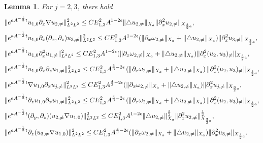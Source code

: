 \documentclass[12pt, reqno]{amsart}
\newtheorem{lemma}{Lemma}[section]
\numberwithin{equation}{section}
\begin{document}
	\begin{lemma}\label{lemma_neq2}
		For $j=2,3$, there hold
		\begin{equation}\label{lemma_neq2_2}
			\begin{aligned}&\|{\rm e}^{aA^{-\frac{1}{3}}t}
				u_{1,0}\partial_x\nabla u_{2,\neq}\|_{L^2L^2}^2\leq
				CE_{1,3}^2A^{1-2\epsilon}\|\triangle u_{2,\neq}\|_{X_a}\|\partial_x^2u_{2,\neq}\|_{X_{\frac32a}},\\
				&\|{\rm e}^{aA^{-\frac{1}{3}}t}
				u_{1,0}\partial_x(\partial_x,\partial_z) u_{3,\neq}\|_{L^2L^2}^2\leq
				CE_{1,3}^2A^{1-2\epsilon}(\|\partial_x\omega_{2,\neq}\|_{X_a}+\|\triangle u_{2,\neq}\|_{X_a})
				\|\partial_x^2u_{3,\neq}\|_{X_{\frac32a}},\\
				&\|{\rm e}^{aA^{-\frac{1}{3}}t}
				u_{1,0}\partial_x^{2} u_{1,\neq}\|_{L^2L^2}^2\leq
				CE_{1,3}^2A^{1-2\epsilon}(\|\partial_x\omega_{2,\neq}\|_{X_a}
				+\|\triangle u_{2,\neq}\|_{X_a})
				\|\partial_x^2(u_2,u_3)_{\neq}\|_{X_{\frac32a}},\\
				&\|e^{aA^{-\frac13}t}u_{1,0}\partial_{x}\partial_{z}u_{1,\neq}\|_{L^{2}L^{2}}^{2}\leq CE_{1,3}^{2}A^{\frac53-2\epsilon}\left(\|\partial_{x}\omega_{2,\neq}\|_{X_{a}}+\|\triangle u_{2,\neq}\|_{X_{a}} \right)\|\partial_{x}^{2}(u_{2},u_{3})_{\neq}\|_{X_{\frac32 a}},
				\\&\|{\rm e}^{aA^{-\frac{1}{3}}t}
				\nabla u_{1,0}\partial_x u_{j,\neq}\|_{L^2L^2}^2\leq
				CE_{1,3}^2A^{\frac43-2\epsilon}(\|\partial_x\omega_{2,\neq}\|_{X_a}+\|\triangle u_{2,\neq}\|_{X_a})
				\|\partial_x^2u_{j,\neq}\|_{X_{\frac32a}},
				\\&\|e^{aA^{-\frac13}t}\partial_{z}u_{1,0}\partial_{x}u_{1,\neq}\|_{L^{2}L^{2}}^{2}\leq CE_{1,3}^{2}A^{\frac53-2\epsilon}\left(\|\partial_{x}\omega_{2,\neq}\|_{X_{a}}+\|\triangle u_{2,\neq}\|_{X_{a}} \right)\|\partial_{x}^{2}(u_{2},u_{3})_{\neq}\|_{X_{\frac32 a}},
				\\
				&\|{\rm e}^{aA^{-\frac{1}{3}}t}(\partial_y,\partial_z)
				(u_{2,\neq}\nabla u_{1,0} )\|^2_{L^2L^2}\leq
				CE_{1,3}^2A^{1-2\epsilon}\|\triangle u_{2,\neq}\|^{\frac32}_{X_a}
				\|\partial_x^2u_{2,\neq}\|_{X_{\frac32a}}^{\frac12},\\
				&\|{\rm e}^{aA^{-\frac{1}{3}}t}\partial_z
				(u_{3,\neq}\nabla u_{1,0} )\|^2_{L^2L^2}\leq
				CE_{1,3}^2A^{\frac43-2\epsilon}(\|\partial_x\omega_{2,\neq}\|_{X_a}+\|\triangle u_{2,\neq}\|_{X_a})
				\|\partial_x^2u_{3,\neq}\|_{X_{\frac32a}}.
			\end{aligned}
		\end{equation}
	\end{lemma}
	
\end{document}
